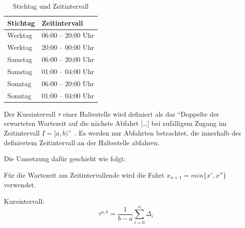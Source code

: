 \begin{table}[H]
    \centering
    \begin{tabular}[c]{l l}
        \toprule
        \textbf{Stichtag}
                                & \textbf{Zeitintervall}\\
        \midrule
        Werktag
                                & 06:00 -- 20:00 Uhr\\
        Werktag
                                & 20:00 -- 00:00 Uhr\\
        \midrule
        Samstag
                                & 06:00 -- 20:00 Uhr\\
        Samstag
                                & 01:00 -- 04:00 Uhr\\
        \midrule
        Sonntag
                                & 06:00 -- 20:00 Uhr\\
        Sonntag
                                & 01:00 -- 04:00 Uhr\\
        \bottomrule
    \end{tabular}
    \caption{Stichtag und Zeitintervall}
    \label{table:Stichtag und Zeitintervall}
\end{table}

Der Kursintervall $\tau$ einer Haltestelle wird definiert als das "`Doppelte der erwarteten Wartezeit auf die nächste Abfahrt [\ldots] bei zufälligem Zugang im Zeitintervall $I = [a,b)$"'~\cite{visum_manual_formula}.
Es werden nur Abfahrten betrachtet, die innerhalb des definiertem Zeitintervall an der Haltestelle abfahren.

Die Umsetzung dafür geschieht wie folgt:


Für die Wartezeit am Zeitintervallende wird die Fahrt $x_{n+1} = min\{x', x''\}$ verwendet.

Kursintervall:
\[
    \tau^{a, b} = \frac{1}{b - a} \sum_{i=0}^n \Delta_i
\]


